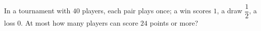 In a tournament with $40$ players, each pair plays once; a win scores $1$, a draw $\dfrac12$, a loss $0$. At most how many players can score $24$ points or more?
